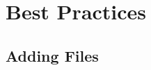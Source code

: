 
{
\begin{frame}[plain]
\end{frame}
}


\section{Best Practices}

\begin{frame}[plain]

  \begin{center}
    \Huge{\textbf{\insertsection}}
  \end{center}

\end{frame}


\subsection{Adding Files}

\begin{frame}

  \begin{center}
    \Huge{\textbf{\insertsubsection}}
  \end{center}

\end{frame}


